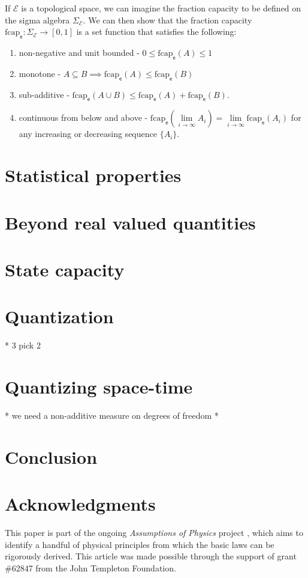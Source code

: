\documentclass[10pt,twocolumn, nofootinbib]{revtex4-2}
\newcommand\frcap{\mathrm{fcap}}
\newcommand{\ens}[1][e] {\mathsf{#1}} %
\newcommand{\Ens}[1][E] {\mathcal{#1}} %
\begin{document}
If $\Ens$ is a topological space, we can imagine the fraction capacity to be defined on the sigma algebra $\Sigma_{\Ens}$. We can then show that the fraction capacity $\frcap_{\ens} : \Sigma_{\Ens} \to [0,1]$ is a set function that satisfies the following:
\begin{enumerate}
	\item non-negative and unit bounded - $0 \leq \frcap_{\ens}(A) \leq 1$
	\item monotone - $A \subseteq B \implies \frcap_{\ens}(A) \leq \frcap_{\ens}(B)$
	\item sub-additive - $\frcap_{\ens}(A \cup B) \leq \frcap_{\ens}(A) + \frcap_{\ens}(B)$.
	\item continuous from below and above - $\frcap_{\ens}(\lim\limits_{i \to \infty} A_i) = \lim\limits_{i \to \infty} \frcap_{\ens}(A_i)$ for any increasing or decreasing sequence $\{A_i\}$.
\end{enumerate}



\section{Statistical properties}

\section{Beyond real valued quantities}


\section{State capacity}

\section{Quantization}
* 3 pick 2

\section{Quantizing space-time}
* we need a non-additive measure on degrees of freedom
*

\section{Conclusion}



\section*{Acknowledgments}
This paper is part of the ongoing \textit{Assumptions of Physics} project \cite{aop-book}, which aims to identify a handful of physical principles from which the basic laws can be rigorously derived. This article was made possible through the support of grant \#62847 from the John Templeton Foundation.




\newcommand{\pj}[1] {\underbar{$#1$}}
\end{document}
